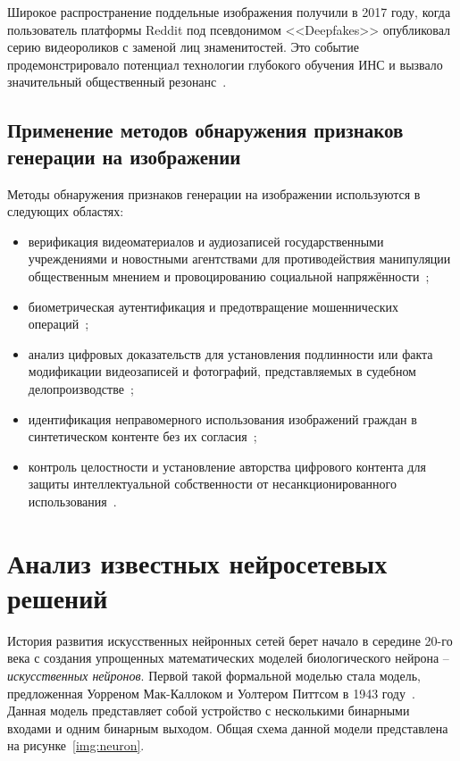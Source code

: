Широкое распространение поддельные изображения получили в 2017 году, когда пользователь платформы Reddit под псевдонимом <<Deepfakes>> опубликовал серию видеороликов с заменой лиц знаменитостей. Это событие продемонстрировало потенциал технологии глубокого обучения ИНС и вызвало значительный общественный резонанс~\cite{spb-uni}.

\subsection{Применение методов обнаружения признаков генерации на изображении}

Методы обнаружения признаков генерации на изображении используются в следующих областях:
\begin{itemize}
	\item верификация видеоматериалов и аудиозаписей государственными учреждениями и новостными агентствами для противодействия манипуляции общественным мнением и провоцированию социальной напряжённости~\cite{deep-fakes}\cite{spb-uni};
	\item биометрическая аутентификация и предотвращение мошеннических операций~\cite{meso4}\cite{capsforensics}\cite{vit};
	\item анализ цифровых доказательств для установления подлинности или факта модификации видеозаписей и фотографий, представляемых в судебном делопроизводстве~\cite{faceforensics}\cite{faceforensicspp};
	\item идентификация неправомерного использования изображений граждан в синтетическом контенте без их согласия~\cite{spb-uni};
	\item контроль целостности и установление авторства цифрового контента для защиты интеллектуальной собственности от несанкционированного использования~\cite{deepfakes-document}.
\end{itemize}

\section{Анализ известных нейросетевых решений}

История развития искусственных нейронных сетей берет начало в середине 20-го века с создания упрощенных математических моделей биологического нейрона -- \textit{искусственных нейронов}. Первой такой формальной моделью стала модель, предложенная Уорреном Мак-Каллоком и Уолтером Питтсом в 1943 году~\cite{neuron}. Данная модель представляет собой устройство с несколькими бинарными входами и одним бинарным выходом. Общая схема данной модели представлена на рисунке~\ref{img:neuron}.

